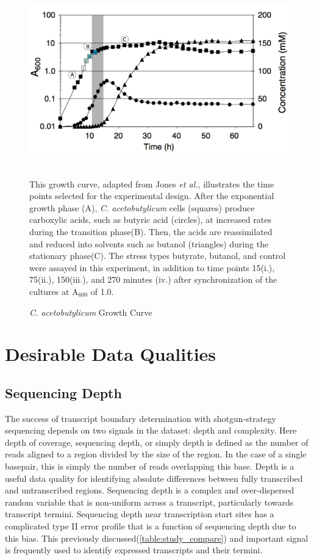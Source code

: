 \begin{figure}[t]
\small
\includegraphics[width=\textwidth,height=3in]{images/Sequencing/Growth_curve.png}
\caption{\textit{C. acetobutylicum} Growth Curve}
\label{fig:4.1}
This growth curve, adapted from Jones \textit{et al.},\cite{180} illustrates the time points selected for the experimental design. After the exponential growth phase (A), \textit{C. acetobutylicum} cells (squares) produce carboxylic acids, such as butyric acid (circles), at increased rates during the transition phase(B). Then, the acids are reassimilated and reduced into solvents such as butanol (triangles) during the stationary phase(C). The stress types butyrate, butanol, and control were assayed in this experiment, in addition to time points 15(i.), 75(ii.), 150(iii.), and 270 minutes (iv.) after synchronization of the cultures at A$_{600}$ of 1.0.
\end{figure}

\section{Desirable Data Qualities}
\subsection{Sequencing Depth}
The success of transcript boundary determination with shotgun-strategy sequencing depends on two signals in the dataset: depth and complexity.\cite{108,109,110,176,177} Here depth of coverage, sequencing depth, or simply depth is defined as the number of reads aligned to a region divided by the size of the region. In the case of a single basepair, this is simply the number of reads overlapping this base. Depth is a useful data quality for identifying absolute differences between fully transcribed and untranscribed regions. Sequencing depth is a complex and over-dispersed random variable\cite{52,53,181} that is non-uniform across a transcript,\cite{179} particularly towards transcript termini.\cite{18} Sequencing depth near transcription start sites has a complicated type II error profile that is a function of sequencing depth due to this bias. This previously discussed(\ref{table:study_compare}) and important signal is frequently used to identify expressed transcripts and their termini.

